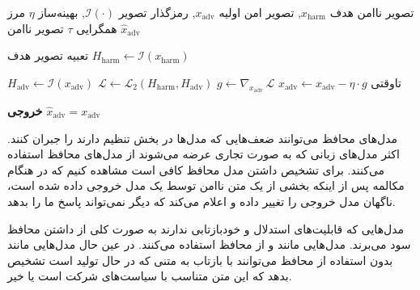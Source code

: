  تصویر ناامن هدف $x_{\mathrm{harm}}$, تصویر امن اولیه $x_{\mathrm{adv}}$, رمزگذار تصویر $\mathcal{I}(\cdot)$, بهینه‌ساز $\eta$
 مرز همگرایی $\tau$
 تصویر ناامن $\hat{x}_{\mathrm{adv}}$

 تعبیه تصویر هدف
 $H_{\mathrm{harm}} \gets \mathcal{I}(x_{\mathrm{harm}})$

     $H_{\mathrm{adv}} \gets \mathcal{I}(x_{\mathrm{adv}})$
     $\mathcal{L} \gets \mathcal{L}_{2}(H_{\mathrm{harm}}, H_{\mathrm{adv}})$ 
     $g \gets \nabla_{x_{\mathrm{adv}}}\,\mathcal{L}$
     $x_{\mathrm{adv}} \gets x_{\mathrm{adv}} - \eta \cdot g$
‌تاوقتی

 \textbf{خروجی} $\hat{x}_{\mathrm{adv}} = x_{\mathrm{adv}}$


مدل‌های محافظ می‌توانند ضعف‌هایی که مدل‌ها در بخش تنظیم دارند را جبران کنند. اکثر مدل‌های زبانی که به صورت تجاری عرضه می‌شوند از مدل‌های محافظ استفاده می‌کنند. برای تشخیص داشتن مدل محافظ کافی است مشاهده کنیم که در هنگام مکالمه پس از اینکه بخشی از یک متن ناامن توسط یک مدل خروجی داده شده است، ناگهان مدل خروجی را تغییر داده و اعلام می‌کند که دیگر نمی‌تواند پاسخ ما را بدهد.

مدل‌هایی که قابلیت‌های استدلال و خودبازتابی ندارند به صورت کلی از داشتن محافظ سود می‌برند. مدل‌هایی مانند  و  از محافظ استفاده می‌کنند. در عین حال مدل‌هایی مانند  بدون استفاده از محافظ می‌توانند با بازتاب به متنی که در حال تولید است تشخیص بدهد که این متن متناسب با سیاست‌های شرکت است یا خیر.


